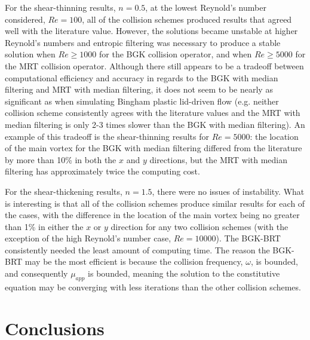 For the shear-thinning results, $n = 0.5$, at the lowest Reynold's number considered, $Re = 100$, all of the collision schemes produced results that agreed well with the literature value.
However, the solutions became unstable at higher Reynold's numbers and entropic filtering was necessary to produce a stable solution when $Re \ge 1000$ for the BGK collision operator, and when $Re \ge 5000$ for the MRT collision operator.
Although there still appears to be a tradeoff between computational efficiency and accuracy in regards to the BGK with median filtering and MRT with median filtering, it does not seem to be nearly as significant as when simulating Bingham plastic lid-driven flow (e.g. neither collision scheme consistently agrees with the literature values and the MRT with median filtering is only 2-3 times slower than the BGK with median filtering).
An example of this tradeoff is the shear-thinning results for $Re = 5000$: the location of the main vortex for the BGK with median filtering differed from the literature by more than 10\% in both the $x$ and $y$ directions, but the MRT with median filtering has approximately twice the computing cost.

For the shear-thickening results, $n = 1.5$, there were no issues of instability.
What is interesting is that all of the collision schemes produce similar results for each of the cases, with the difference in the location of the main vortex being no greater than 1\% in either the $x$ or $y$ direction for any two collision schemes (with the exception of the high Reynold's number case, $Re = 10000$).
The BGK-BRT consistently needed the least amount of computing time.
The reason the BGK-BRT may be the most efficient is because the collision frequency, $\omega$, is bounded, and consequently $\mu_{app}$ is bounded, meaning the solution to the constitutive equation may be converging with less iterations than the other collision schemes.

\section{Conclusions} \label{sec:numerical-study-conclusions}

